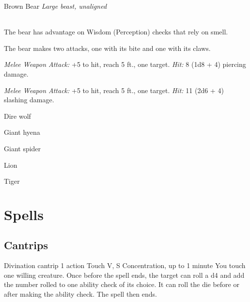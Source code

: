 \documentclass[10pt,twoside,twocolumn,openany]{book}
\begin{document}
\begin{monsterboxnobg}{Brown Bear}
	\textit{Large beast, unaligned}\\
	\hline
	\basics[
		armorclass	= 11 (natural armor),
		hitpoints		= 34 (4d10 + 12),
		speed		= {40 ft., climb 30 ft.}
	]
	\hline
	\stats[
		STR	= \stat{19},
		DEX	= \stat{10},
		CON	= \stat{16},
		INT	= \stat{2},
		WIS	= \stat{13},
		CHA	= \stat{7}
	]
	\hline
	\details[
		skills			= {Perception +3},
		senses		= {passive Perception 13},
		languages		= {-},
		challenge		= 1
	]
	\hline \\[1mm]
	\begin{monsteraction}
		The bear has advantage on Wisdom (Perception) checks that rely on smell.
	\end{monsteraction}
	\begin{monsteraction}[Multiattack]
		The bear makes two attacks, one with its bite and one with its claws.
	\end{monsteraction}
	
	\begin{monsteraction}[Bite]
		\textit{Melee Weapon Attack:} +5 to hit, reach 5 ft., one target. \textit{Hit:} 8 (1d8 + 4) piercing damage.
	\end{monsteraction}
	
	\begin{monsteraction}[Claws]
		\textit{Melee Weapon Attack:} +5 to hit, reach 5 ft., one target. \textit{Hit:} 11 (2d6 + 4) slashing damage.
	\end{monsteraction}	
\end{monsterboxnobg}

Dire wolf

Giant hyena

Giant spider

Lion

Tiger
\chapter{Spells}
\section{Cantrips}
{Divination cantrip}
{\color{action} 1 action}
{Touch}
{V, S}
{Concentration, up to 1 minute}
%
You touch one willing creature. Once before the spell ends, the target can roll a d4 and add the number rolled to one ability check of its choice. It can roll the die before or after making the ability check. The spell then ends. 
\end{document}
